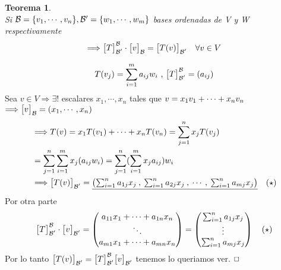 \documentclass[]{article}
\newtheorem{theorem}{Teorema}
\newenvironment{proof}{\noindent{\bf Prueba:}}{$\hfill \Box$ \vspace{10pt}}
\newcommand{\ida}{\Longrightarrow}
\newcommand{\base}{\text{$\mathcal{B}$}}
\newcommand{\basep}{\text{$\mathcal{B}^{\prime}$}}
\begin{document}
\begin{theorem}
    \\
    Si $\base=\conjunto{\vc{1},\cdots,\vc{n}},\basep=\conjunto{\wc{1},\cdots,\wc{m}}$ bases ordenadas de V y W
    respectivamente
    \begin{align*}
        \ida \cb \cdot \cbs{v}{\base}{} = \cbs{\T{v}}{\basep}{} \quad \forall v \in V 
    \end{align*}
\end{theorem}
\begin{proof}
    \begin{align*}
        \T{\vc{j}}=\sum_{i=1}^{m} a_{ij}\wc{i} \text{ , } \cb=(a_{ij})
    \end{align*}
    Sea $v \in V \ida \exists!$ escalares $x_1,\cdots,x_n$ tales que $v=x_1\text{$v_{1}$}+\cdots+x_n\text{$v_{n}$}$
    $\ida \cbs{v}{\base}{}=(x_1,\cdots,x_n)$
    \begin{align*}
            &\ida \T{v}=x_1\T{v_1}+\cdots+x_n\T{v_n}= \sum_{j=1}^{n}x_j\T{\vc{j}}\\
            &=\sum_{j=1}^{n}\sum_{i=1}^{m}x_j (a_{ij}w_i)=\sum_{j=1}^{n}(\sum_{i=1}^{m}x_j a_{ij})w_i\\
            &\ida \cbs{\T{v}}{\basep}{}=
            \underline{
            \begin{pmatrix}
            \sum_{i=1}^{n}a_{1j}x_j \:,\: \sum_{i=1}^{n}a_{2j}x_j \:,\: \cdots \:,\: \sum_{i=1}^{n}a_{mj}x_j    
            \end{pmatrix}
            }
            \quad (\star)
    \end{align*}
    Por otra parte
    \begin{align*}
        \cb \cdot \cbs{v}{\basep}{}=
        \begin{pmatrix}
            a_{11}x_1 + \cdots + a_{1n}x_n\\
            \ddots\\
            a_{m1}x_1 + \cdots + a_{mn}x_n
        \end{pmatrix}=
        \begin{pmatrix}
            \sum_{i=1}^{n}a_{1j}x_j\\
            \vdots\\
            \sum_{i=1}^{n}a_{mj}x_j
        \end{pmatrix}
        \quad (\star)
    \end{align*}
    Por lo tanto $\cbs{\T{v}}{\basep}{}=\cb\cbs{v}{\basep}{}$ tenemos lo queriamos ver.
\end{proof}
\end{document}
